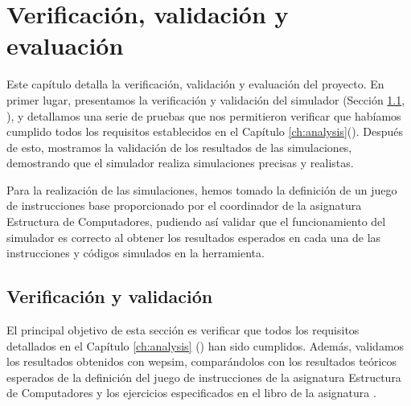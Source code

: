 \chead[]{}
\renewcommand{\headrulewidth}{0.5pt}

\lfoot[]{}
\cfoot[]{}
\rfoot[]{}
\renewcommand{\footrulewidth}{0pt}

\chapter{Verificación, validación y evaluación}
\label{ch:verification_validation_and_evaluation}


Este capítulo detalla la verificación, validación y evaluación del proyecto. En primer lugar, presentamos la verificación y validación del simulador (Sección \ref{sec:verification_and_validation}, \textit{}), y detallamos una serie de pruebas que nos permitieron verificar que habíamos cumplido todos los requisitos establecidos en el Capítulo  \ref{ch:analysis}(\textit{}). Después de esto, mostramos la validación de los resultados de las simulaciones, demostrando que el simulador realiza simulaciones precisas y realistas.

Para la realización de las simulaciones, hemos tomado la definición de un juego de instrucciones base proporcionado por el coordinador de la asignatura Estructura de Computadores, pudiendo así validar que el funcionamiento del simulador es correcto al obtener los resultados esperados en cada una de las instrucciones y códigos simulados en la herramienta. 

\section{Verificación y validación}
\label{sec:verification_and_validation}

El principal objetivo de esta sección es verificar que todos los requisitos detallados en el Capítulo \ref{ch:analysis} (\textit{}) han sido cumplidos. Además, validamos los resultados obtenidos con \acrshort{wepsim}, comparándolos con los resultados teóricos esperados de la definición del juego de instrucciones de la asignatura Estructura de Computadores y los ejercicios especificados en el libro de la asignatura \cite{perez2015problemas}.


